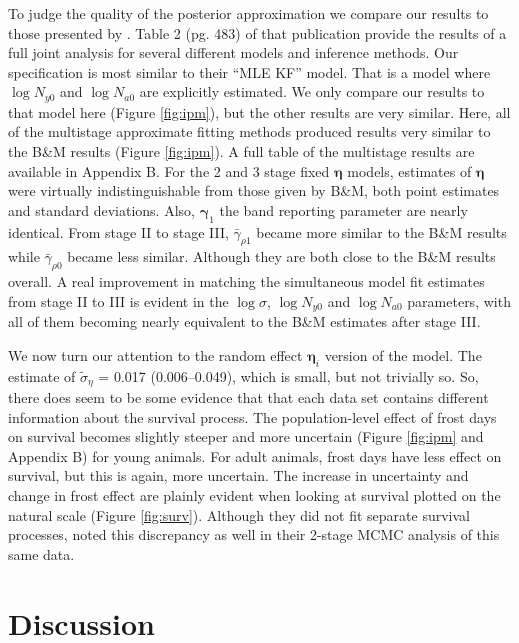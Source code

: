 \documentclass[12pt]{article}
\newcommand{\bn}{\boldsymbol{\eta}}
\newcommand{\bg}{\boldsymbol{\gamma}}
\begin{document}
To judge the quality of the posterior approximation we compare our results to those presented by \cite{besbeas2019exact}. Table 2 (pg. 483) of that publication provide the results of a full joint analysis for several different models and inference methods. Our specification is most similar to their ``MLE KF'' model. That is a model where $\log N_{y0}$ and $\log N_{a0}$ are explicitly estimated.  We only compare our results to that model here (Figure \ref{fig:ipm}), but the other results are very similar. Here, all of the multistage approximate fitting methods produced results very similar to  the B\&M results (Figure \ref{fig:ipm}). A full table of the multistage results are available in Appendix B. For the 2 and 3 stage fixed $\bn$ models, estimates of $\bn$ were virtually indistinguishable from those given by B\&M, both point estimates and standard deviations. Also, $\bg_1$ the band reporting parameter are nearly identical. From stage II to stage III, $\bar{\gamma}_{\rho 1}$ became more similar to the B\&M results while $\bar{\gamma}_{\rho 0}$ became less similar. Although they are both close to the B\&M results overall. A real improvement in matching the simultaneous model fit estimates from stage II to III is evident in the $\log \sigma$, $\log N_{y0}$ and $\log N_{a0}$ parameters, with all of them becoming nearly equivalent to the B\&M estimates after stage III.  

We now turn our attention to the random effect $\bn_i$ version of the model. The estimate of $\tilde{\sigma}_\eta$ = 0.017 (0.006--0.049), which is small, but not trivially so. So, there does seem to be some evidence that that each data set contains different information about the survival process. The population-level effect of frost days on survival becomes slightly steeper and more uncertain (Figure \ref{fig:ipm} and Appendix B) for young animals. For adult animals, frost days have less effect on survival, but this is again, more uncertain. The increase in uncertainty and change in frost effect are plainly evident when looking at survival plotted on the natural scale (Figure \ref{fig:surv}). Although they did not fit separate survival processes, \citet{goudie2019joining} noted this discrepancy as well in their 2-stage MCMC analysis of this same data.          


\section{Discussion}
\end{document}

